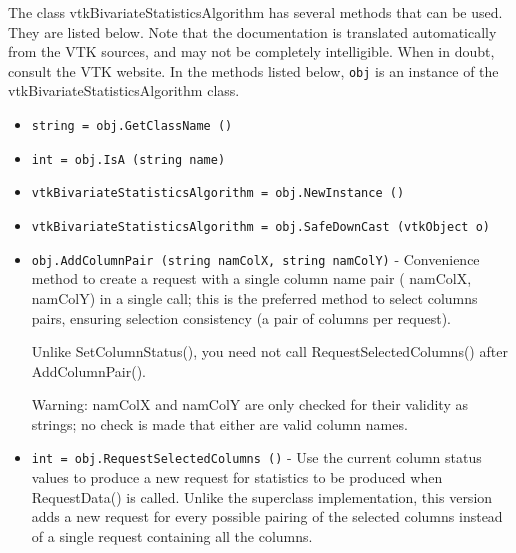 The class vtkBivariateStatisticsAlgorithm has several methods that can be used.
  They are listed below.
Note that the documentation is translated automatically from the VTK sources,
and may not be completely intelligible.  When in doubt, consult the VTK website.
In the methods listed below, \verb|obj| is an instance of the vtkBivariateStatisticsAlgorithm class.
\begin{itemize}
\item  \verb|string = obj.GetClassName ()|

\item  \verb|int = obj.IsA (string name)|

\item  \verb|vtkBivariateStatisticsAlgorithm = obj.NewInstance ()|

\item  \verb|vtkBivariateStatisticsAlgorithm = obj.SafeDownCast (vtkObject o)|

\item  \verb|obj.AddColumnPair (string namColX, string namColY)| -  Convenience method to create a request with a single column name pair 
  ( namColX,  namColY) in a single call; this is the preferred method to select 
 columns pairs, ensuring selection consistency (a pair of columns per request).

 Unlike SetColumnStatus(), you need not call RequestSelectedColumns() after AddColumnPair().

 Warning:  namColX and  namColY are only checked for their validity as strings;
 no check is made that either are valid column names.

\item  \verb|int = obj.RequestSelectedColumns ()| -  Use the current column status values to produce a new request for statistics
 to be produced when RequestData() is called.
 Unlike the superclass implementation, this version adds a new request for every
 possible pairing of the selected columns
 instead of a single request containing all the columns.

\end{itemize}
